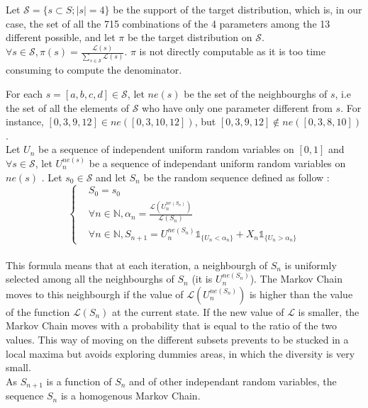 Let $\mathcal{S} = \{ s\subset S ;  \vert s \vert = 4 \}$ be the support of the target distribution, which is, in our case, the set of all the 715 combinations of the 4 parameters among the 13 different possible, and let $\pi$ be the target distribution on $\mathcal{S}$.
$\forall s \in \mathcal{S}, \pi(s) = \frac{\mathcal{L}(s)}{\sum_{s \in \mathcal{S}}  \mathcal{L}(s)} $. $\pi$ is not directly computable as it is too time consuming to compute the denominator.


For each $s = [a, b, c, d] \in \mathcal{S}$, let $ne(s)$ be the set of the neighbourghs of $s$, i.e the set of all the elements of $\mathcal{S}$ who have only one parameter different from $s$. 
For instance, $[0, 3, 9, 12] \in ne([0, 3, 10, 12])$, but $[0, 3, 9, 12] \notin ne([0, 3, 8, 10])$.\\

Let $U_n$ be a sequence of independent uniform random variables on $[0, 1]$ and $\forall s \in \mathcal{S}$, let $U_{n}^{ne(s)}$ be a sequence of independant uniform random variables on $ne(s)$ .
Let $s_0 \in \mathcal{S}$ and let  $S_n$ be the random sequence defined as follow : \\


\[
 \left\{
    \begin{aligned}
        & S_0 = s_0 \\
        & \forall n \in \mathbb{N}, \alpha_n = \frac{\mathcal{L}(U_{n}^{ne(S_n)})}{\mathcal{L}(S_n)} \\
        & \forall n \in \mathbb{N}, S_{n+1} = U_{n}^{ne(S_n)} \mathbb{1}_{\{U_n < \alpha_n\}} + X_n \mathbb{1}_{\{U_n > \alpha_n\}}
\end{aligned}
\right.
\]
\\[0.5cm]

This formula means that at each iteration, a neighbourgh of $S_n$ is uniformly selected among all the neighbourghs of $S_n$ (it is $U_n^{ne(S_n)}$). 
The Markov Chain moves to this neighbourgh if the value of  $\mathcal{L}(U_n^{ne(S_n)})$ is higher than the value of the function $\mathcal{L}(S_n)$ at the current state.
If the new value of $\mathcal{L}$ is smaller, the Markov Chain moves with a probability that is equal to the ratio of the two values.
This way of moving on the different subsets prevents to be stucked in a local maxima but avoids exploring dummies areas, in which the diversity is very small. \\
As $S_{n+1}$ is a function of $S_n$ and of other independant random variables, the sequence $S_n$ is a homogenous Markov Chain.


